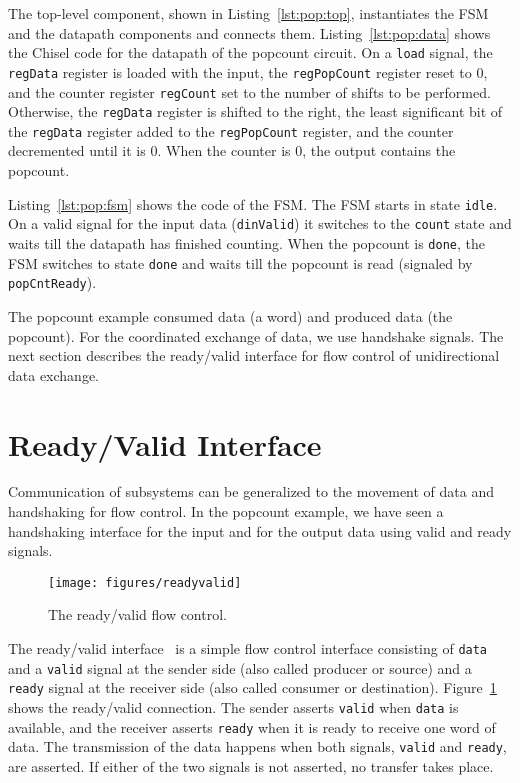 \documentclass[%
    10pt,
    headinclude, footexclude,
    openright, %
    notitlepage,
    cleardoubleempty,
    headsepline,
    pointlessnumbers,
    bibtotoc, idxtotoc,
    ]{scrbook}
\newcommand{\scale}{0.7}
\newcommand{\code}[1]{{\lstinline[basicstyle=\small\ttfamily]{#1}}}
\begin{document}
The top-level component, shown in Listing~\ref{lst:pop:top}, instantiates the FSM and the datapath
components and connects them.
Listing~\ref{lst:pop:data} shows the Chisel code for the datapath of the popcount
circuit.
On a \code{load} signal, the \code{regData} register is loaded with the input,
the \code{regPopCount} register reset to 0, and the counter register \code{regCount}
set to the number of shifts to be performed.
Otherwise, the \code{regData} register is shifted to the right, the least significant bit
of the \code{regData} register added to the \code{regPopCount} register, and the counter
decremented until it is 0. When the counter is 0, the output contains the popcount.

\newpage
{}

Listing~\ref{lst:pop:fsm} shows the code of the FSM.
The FSM starts in state \code{idle}. On a valid signal for the input data (\code{dinValid}) it
switches to the \code{count} state and waits till the datapath has finished counting.
When the popcount is \code{done}, the FSM switches to state \code{done} and waits till the
popcount is read (signaled by \code{popCntReady}).


The popcount example consumed data (a word) and produced data (the popcount).
For the coordinated exchange of data, we use handshake signals.
The next section describes the ready/valid interface for flow control of
unidirectional data exchange.

\section{Ready/Valid Interface}
\label{sec:ready:valid}

Communication of subsystems can be generalized to the movement
of data and handshaking for flow control. In the popcount example,
we have seen a handshaking interface for the input and for the output data
using valid and ready signals.

\begin{figure}
  \centering
  \texttt{[image: figures/readyvalid]}
  \caption{The ready/valid flow control.}
  \label{fig:readyvalid}
\end{figure}

The ready/valid interface~\cite[p.~480]{dally:vhdl:2016} is a simple flow
control interface consisting of \code{data} and a \code{valid} signal at the
sender side (also called producer or source) and a \code{ready}
signal at the receiver side (also called consumer or destination).
Figure~\ref{fig:readyvalid} shows the ready/valid connection.
The sender asserts \code{valid} when \code{data} is available,
and the receiver asserts \code{ready} when it is ready to receive one word
of data. The transmission of the data happens when both signals, \code{valid}
and \code{ready}, are asserted. If either of the two signals is not asserted,
no transfer takes place.
\end{document}
